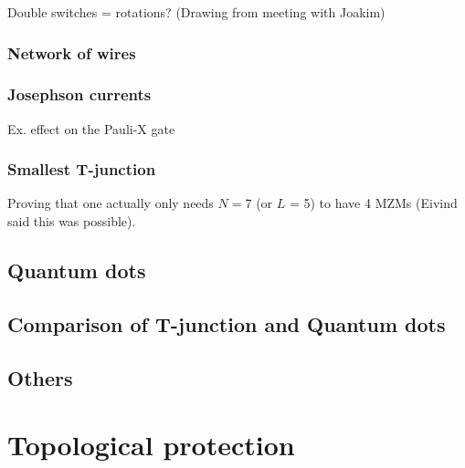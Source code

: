 Double switches = rotations? (Drawing from meeting with Joakim)

\begin{figure}
    \centering
    \caption{}
    \label{fig:Pauli-X_gate}
\end{figure}

\subsubsection{Network of wires}

\subsubsection{Josephson currents}
Ex. effect on the Pauli-X gate

\subsubsection{Smallest T-junction}
Proving that one actually only needs $N = 7$ (or $L$ = 5) to have 4 MZMs (Eivind said this was possible).

\subsection{Quantum dots}

\subsection{Comparison of T-junction and Quantum dots}

\subsection{Others}

\section{Topological protection}